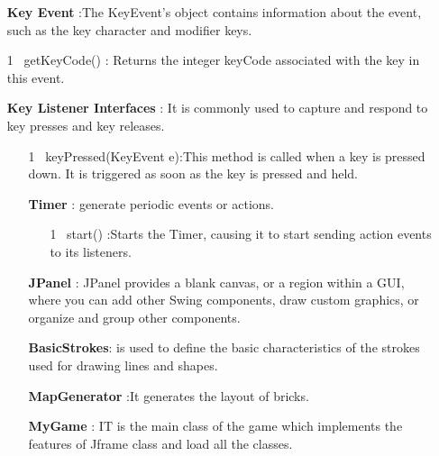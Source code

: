 \documentclass{article}
\begin{document}
\begin{enumerate}
\begin{enumerate}
      \item[\bullet]\textbf{Key Event }:The KeyEvent's object  contains information about the event, such as the key character and modifier keys.
        \item[1]\ getKeyCode() : Returns the integer keyCode associated with the key in this event.
      \item[\bullet]\textbf{Key Listener Interfaces} : It is commonly used to capture and respond to key presses and key releases. 
       \begin{enumerate}
         \item[1]\ keyPressed(KeyEvent e):This method is called when a key is pressed down. It is triggered as soon as the key is pressed and held.
     \item[\bullet]\textbf{Timer} : generate periodic events or actions.
              \begin{enumerate}
      \item[1]\ start() :Starts the Timer, causing it to start sending action events to its listeners.
         \end{enumerate}
     \item[\bullet]\textbf{JPanel} : JPanel provides a blank canvas, or a region within a GUI, where you can add other Swing components, draw custom graphics, or organize and group other components. 
     \item[\bullet]\textbf{BasicStrokes}:  is used to define the basic characteristics of the strokes used for drawing lines and shapes.
     \item[\bullet]\textbf{MapGenerator } :It generates the layout of bricks.
     \item[\bullet]\textbf{MyGame }: IT is the main class of the game which implements the features of Jframe class and load all the classes.
       

\end{enumerate}
\end{enumerate}
\end{enumerate}
\end{document}

